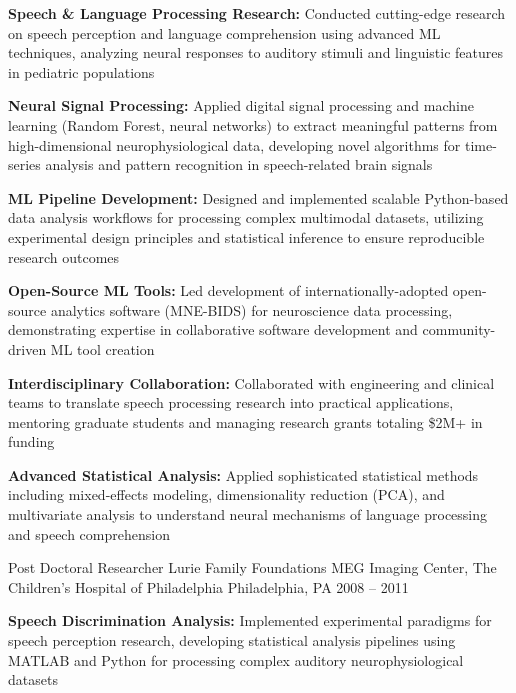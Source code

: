 \begin{cventries}
    {
      \begin{cvitems}
        \item \textbf{Speech \& Language Processing Research:} Conducted cutting-edge research on speech perception and language comprehension using advanced ML techniques, analyzing neural responses to auditory stimuli and linguistic features in pediatric populations
        \item \textbf{Neural Signal Processing:} Applied digital signal processing and machine learning (Random Forest, neural networks) to extract meaningful patterns from high-dimensional neurophysiological data, developing novel algorithms for time-series analysis and pattern recognition in speech-related brain signals
        \item \textbf{ML Pipeline Development:} Designed and implemented scalable Python-based data analysis workflows for processing complex multimodal datasets, utilizing experimental design principles and statistical inference to ensure reproducible research outcomes
        \item \textbf{Open-Source ML Tools:} Led development of internationally-adopted open-source analytics software (MNE-BIDS) for neuroscience data processing, demonstrating expertise in collaborative software development and community-driven ML tool creation
        \item \textbf{Interdisciplinary Collaboration:} Collaborated with engineering and clinical teams to translate speech processing research into practical applications, mentoring graduate students and managing research grants totaling \$2M+ in funding
        \item \textbf{Advanced Statistical Analysis:} Applied sophisticated statistical methods including mixed-effects modeling, dimensionality reduction (PCA), and multivariate analysis to understand neural mechanisms of language processing and speech comprehension
      \end{cvitems}
    }
  \cventry
    {Post Doctoral Researcher}
    {Lurie Family Foundations MEG Imaging Center, The Children's Hospital of Philadelphia}
    {Philadelphia, PA}
    {2008 -- 2011}
    {
      \begin{cvitems}
        \item \textbf{Speech Discrimination Analysis:} Implemented experimental paradigms for speech perception research, developing statistical analysis pipelines using MATLAB and Python for processing complex auditory neurophysiological datasets

\end{cvitems}}
\end{cventries}
